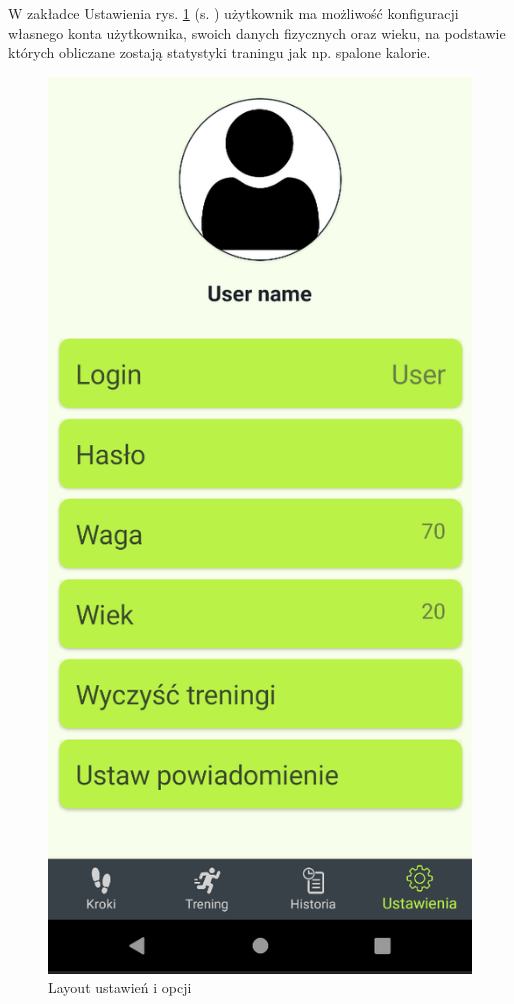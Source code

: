 \hspace{0.60cm}W zakładce Ustawienia rys. \ref{rys:rysunek001e} (s. \pageref{rys:rysunek001e}) użytkownik ma możliwość konfiguracji własnego konta użytkownika, swoich danych fizycznych oraz wieku, na podstawie których obliczane zostają statystyki traningu jak np. spalone kalorie.

\begin{figure}[!htb]
	\centering
	\includegraphics[width=.2\linewidth]{rys/ustawienia2.png}
	\caption{Layout ustawień i opcji}
	\label{rys:rysunek001e}
\end{figure}